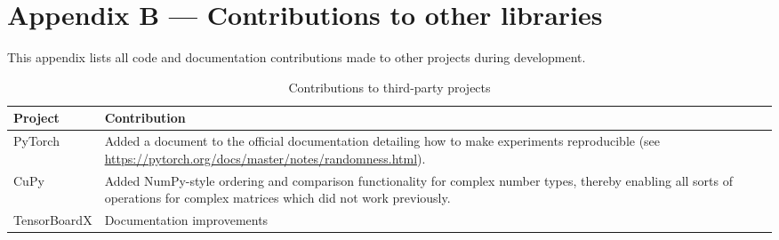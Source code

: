 \chapter{Appendix B --- Contributions to other libraries}\label{ch:appendixB}

This appendix lists all code and documentation contributions made to other projects during
development.

\begin{table}
    \centering
    \caption{Contributions to third-party projects}
    \label{tbl:pull}
    \begin{tabularx}{\textwidth}{lX}
        \toprule
        Project      & Contribution \tabularnewline
        \midrule
        PyTorch      & Added a document to the official documentation detailing how to make experiments reproducible (see \url{https://pytorch.org/docs/master/notes/randomness.html}).  \tabularnewline
        CuPy         & Added NumPy-style ordering and comparison functionality for complex number types, thereby enabling all sorts of operations for complex matrices which did not work previously. \tabularnewline
        TensorBoardX & Documentation improvements \tabularnewline
        \bottomrule
    \end{tabularx}
\end{table}
